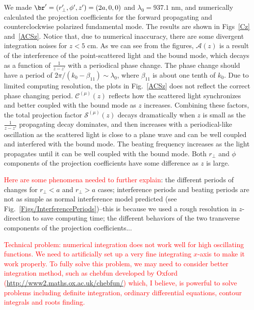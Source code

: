 We made $ \br'=(r'_\perp,\phi',z')=(2a,0,0) $ and $ \lambda_0=937.1 $ nm, and numerically calculated the projection coefficients for the forward propagating and counterclockwise polarized fundamental mode. The results are shown in Figs~\ref{Cz} and~\ref{ACSz}. Notice that, due to numerical inaccuracy, there are some divergent integration noises for $ z<5 $ cm. As we can see from the figures, $ \mathcal{A}(z) $ is a result of the interference of the point-scattered light and the bound mode, which decays as a function of $ \frac{1}{z-z'} $ with a periodical phase change. The phase change should have a period of $ 2\pi/(k_0-\beta_{11})\sim \lambda_0 $, where $ \beta_{11} $ is about one tenth of $ k_0 $. Due to limited computing resolution, the plots in Fig.~\ref{ACSz} does not reflect the correct phase changing period. $ \mathcal{C}^{(\mu)}(z) $ reflects how the scattered light synchronizes and better coupled with the bound mode as $ z $ increases. Combining these factors, the total projection factor $ \mathcal{S}^{(\mu)}(z) $ decays dramatically when $ z $ is small as the $ \frac{1}{z-z'} $ propagating decay dominates, and then increases with a periodical-like oscillation as the scattered light is close to a plane wave and can be well coupled and interfered with the bound mode. The beating frequency increases as the light propagates until it can be well coupled with the bound mode. Both $ r_\perp $ and $ \phi $ components of the projection coefficients have some difference as $ z $ is large. 

\textcolor{red}{Here are some phenomena needed to further explain}: the different periods of changes for $ r_\perp< a $ and $ r_\perp>a $ cases; interference periods and beating periods are not as simple as normal interference model predicted (see Fig.~\ref{Figs/InterferencePeriods})--this is because we used a rough resolution in $ z $-direction to save computing time; the different behaviors of the two transverse components of the projection coefficients...

\textcolor{red}{Technical problem: numerical integration does not work well for high oscillating functions. We need to artificially set up a very fine integrating $ x $-axis to make it work properly. To fully solve this problem, we may need to consider better integration method, such as chebfun developed by Oxford (\url{http://www2.maths.ox.ac.uk/chebfun/}) which, I believe, is powerful to solve problems including definite integration, ordinary differential equations, contour integrals and roots finding. }

